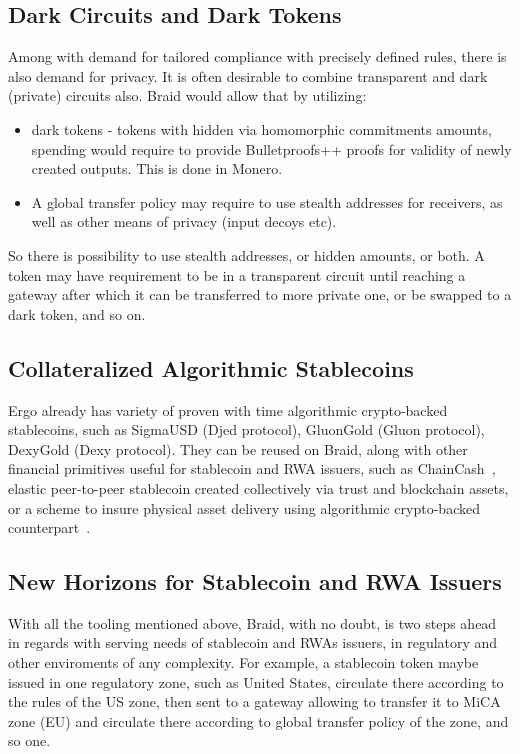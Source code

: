 \documentclass{llncs}   %
\newcommand{\bc}{Braid}
\begin{document}
\subsection{Dark Circuits and Dark Tokens}

Among with demand for tailored compliance with precisely defined rules, there is also demand for privacy. It is often
desirable to combine transparent and dark (private) circuits also. \bc{} would allow that by utilizing:

\begin{itemize}
  \item dark tokens - tokens with hidden via homomorphic commitments amounts, spending would require to provide
        Bulletproofs++ proofs for validity of newly created outputs. This is done in Monero.
  \item A global transfer policy may require to use stealth addresses for receivers, as well as other means of privacy
        (input decoys etc).
\end{itemize}

So there is possibility to use stealth addresses, or hidden amounts, or both. A token may have requirement to be in a
transparent circuit until reaching a gateway after which it can be transferred to more private one, or be swapped to
a dark token, and so on.

\subsection{Collateralized Algorithmic Stablecoins}

Ergo already has variety of proven with time algorithmic crypto-backed stablecoins, such as SigmaUSD (Djed protocol),
GluonGold (Gluon protocol), DexyGold (Dexy protocol). They can be reused on \bc{}, along with other financial primitives
 useful for stablecoin and RWA issuers, such as ChainCash~\cite{chaincash}, elastic peer-to-peer stablecoin created collectively via
trust and blockchain assets, or a scheme to insure physical asset delivery using algorithmic crypto-backed counterpart~\cite{insurance}.

\subsection{New Horizons for Stablecoin and RWA Issuers}

With all the tooling mentioned above, \bc{}, with no doubt, is two steps ahead in regards with serving needs of stablecoin
 and RWAs issuers, in regulatory and other enviroments of any complexity.
For example, a stablecoin token maybe issued in one regulatory zone, such as United States, circulate there according to the rules
of the US zone, then sent to a gateway allowing to transfer it to MiCA zone (EU) and circulate there according to global transfer policy of the zone,
 and so one.
\end{document}
